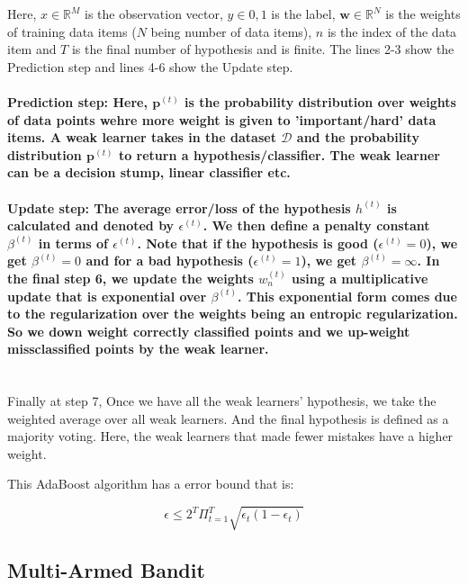 \documentclass[11pt]{article}
\begin{document}
Here, $x \in \mathbb{R}^M$ is the observation vector, $y \in {0,1}$ is the label, $\mathbf{w}\in \mathbb{R}^N$ is the weights of training data items ($N$ being number of data items), $n$ is the index of the data item and $T$ is the final number of hypothesis and is finite. The lines 2-3 show the Prediction step and lines 4-6 show the Update step. 

\paragraph{\textbf{Prediction step:} \normalfont Here, $\mathbf{p}^{(t)}$ is the probability distribution over weights of data points wehre more weight is given to 'important/hard' data items. A weak learner takes in the dataset $\mathcal{D}$ and the probability distribution $\mathbf{p}^{(t)}$ to return a hypothesis/classifier. The weak learner can be a decision stump, linear classifier etc.}

\paragraph{\textbf{Update step:} \normalfont The average error/loss of the hypothesis $h^{(t)}$ is calculated and denoted by $\epsilon^{(t)}$. We then define a penalty constant $\beta^{(t)}$ in terms of $\epsilon^{(t)}$. Note that if the hypothesis is good ($\epsilon^{(t)}=0$), we get $\beta^{(t)}=0$ and for a bad hypothesis ($\epsilon^{(t)}=1$), we get $\beta^{(t)}=\infty$. In the final step 6, we update the weights $w_n^{(t)}$ using a multiplicative update that is exponential over $\beta^{(t)}$. This exponential form comes due to the regularization over the weights being an entropic regularization. So we down weight correctly classified points and we up-weight missclassified points by the weak learner.\\ \\}

Finally at step 7, Once we have all the weak learners' hypothesis, we take the weighted average over all weak learners. And the final hypothesis is defined as a majority voting. Here, the weak learners that made fewer mistakes have a higher weight.

This AdaBoost algorithm has a error bound that is:

\begin{equation}
      \epsilon \leq 2^T \Pi_{t=1}^T \sqrt{\epsilon_t (1-\epsilon_t)}
\end{equation}

\subsection{Multi-Armed Bandit}
\end{document}
